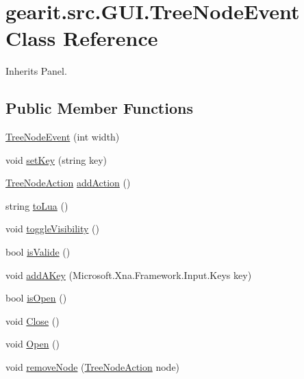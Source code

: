 \hypertarget{classgearit_1_1src_1_1_g_u_i_1_1_tree_node_event}{\section{gearit.\+src.\+G\+U\+I.\+Tree\+Node\+Event Class Reference}
\label{classgearit_1_1src_1_1_g_u_i_1_1_tree_node_event}
}


Inherits Panel.

\subsection*{Public Member Functions}
\begin{DoxyCompactItemize}
\item 
\hyperlink{classgearit_1_1src_1_1_g_u_i_1_1_tree_node_event_a793877eaff33c5285d171e4de39ef65c}{Tree\+Node\+Event} (int width)
\item 
void \hyperlink{classgearit_1_1src_1_1_g_u_i_1_1_tree_node_event_a6a1509b7214968fca07ed3d0018b7afa}{set\+Key} (string key)
\item 
\hyperlink{classgearit_1_1src_1_1_g_u_i_1_1_tree_node_action}{Tree\+Node\+Action} \hyperlink{classgearit_1_1src_1_1_g_u_i_1_1_tree_node_event_af1574dafd6b733eed75b61c35a3b2fd0}{add\+Action} ()
\item 
string \hyperlink{classgearit_1_1src_1_1_g_u_i_1_1_tree_node_event_a7708bc85c1e4eb9dad27e27c8a6784a0}{to\+Lua} ()
\item 
void \hyperlink{classgearit_1_1src_1_1_g_u_i_1_1_tree_node_event_a52ea75063ad02a7046c998c66ba9f75c}{toggle\+Visibility} ()
\item 
bool \hyperlink{classgearit_1_1src_1_1_g_u_i_1_1_tree_node_event_ae8225271439ac48fc8c96a30aeca0460}{is\+Valide} ()
\item 
void \hyperlink{classgearit_1_1src_1_1_g_u_i_1_1_tree_node_event_a32727ad934162d1b8421dd4ba716606d}{add\+A\+Key} (Microsoft.\+Xna.\+Framework.\+Input.\+Keys key)
\item 
bool \hyperlink{classgearit_1_1src_1_1_g_u_i_1_1_tree_node_event_adba7edeb809e69a570193f23c9f1e2ad}{is\+Open} ()
\item 
void \hyperlink{classgearit_1_1src_1_1_g_u_i_1_1_tree_node_event_aec5b77df4325270ae065dda43c8c5526}{Close} ()
\item 
void \hyperlink{classgearit_1_1src_1_1_g_u_i_1_1_tree_node_event_ad0792632f561aad4867ac0041adf1ded}{Open} ()
\item 
void \hyperlink{classgearit_1_1src_1_1_g_u_i_1_1_tree_node_event_a93e50fc52d1e28b91dcfd87e75a41d85}{remove\+Node} (\hyperlink{classgearit_1_1src_1_1_g_u_i_1_1_tree_node_action}{Tree\+Node\+Action} node)
\end{DoxyCompactItemize}
